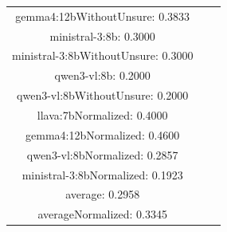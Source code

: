\documentclass[a4paper]{article}
\begin{document}
\begin{tabular}{ccc}
gemma4:12bWithoutUnsure: 0.3833 \\ ministral-3:8b: 0.3000 \\ ministral-3:8bWithoutUnsure: 0.3000 \\ qwen3-vl:8b: 0.2000 \\ qwen3-vl:8bWithoutUnsure: 0.2000 \\ llava:7bNormalized: 0.4000 \\ gemma4:12bNormalized: 0.4600 \\ qwen3-vl:8bNormalized: 0.2857 \\ ministral-3:8bNormalized: 0.1923 \\ average: 0.2958 \\ averageNormalized: 0.3345 \end{minipage}\\
\end{tabular}

\vspace{5mm}
\end{document}

